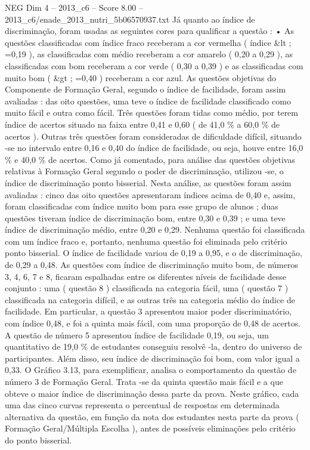 \begin{textsample}{NEG Dim 4 – 2013\_c6 – Score 8.00 – 2013\_c6/enade\_2013\_nutri\_5b06570937.txt}
Já quanto ao índice de discriminação, foram usadas as seguintes cores para qualificar a questão : • As questões classificadas com índice fraco receberam a cor vermelha ( índice \&lt ; =0,19 ), as classificadas com médio receberam a cor amarelo ( 0,20 a 0,29 ), as classificadas com bom receberam a cor verde ( 0,30 a 0,39 ) e as classificadas com muito bom ( \&gt ; =0,40 ) receberam a cor azul.
As questões objetivas do Componente de Formação Geral, segundo o índice de facilidade, foram assim avaliadas : das oito questões, uma teve o índice de facilidade classificado como muito fácil e outra como fácil.
Três questões foram tidas como médio, por terem índice de acertos situado na faixa entre 0,41 e 0,60 ( de 41,0 \% a 60,0 \% de acertos ).
Outras três questões foram consideradas de dificuldade difícil, situando -se no intervalo entre 0,16 e 0,40 do índice de facilidade, ou seja, houve entre 16,0 \% e 40,0 \% de acertos.
Como já comentado, para análise das questões objetivas relativas à Formação Geral segundo o poder de discriminação, utilizou -se, o índice de discriminação ponto bisserial.
Nesta análise, as questões foram assim avaliadas : cinco das oito questões apresentaram índices acima de 0,40 e, assim, foram classificadas com índice muito bom para esse grupo de alunos ; duas questões tiveram índice de discriminação bom, entre 0,30 e 0,39 ; e uma teve índice de discriminação médio, entre 0,20 e 0,29.
Nenhuma questão foi classificada com um índice fraco e, portanto, nenhuma questão foi eliminada pelo critério ponto bisserial.
O índice de facilidade variou de 0,19 a 0,95, e o de discriminação, de 0,29 a 0,48.
As questões com índice de discriminação muito bom, de números 3, 4, 6, 7 e 8, ficaram espalhadas entre os diferentes níveis de facilidade desse conjunto : uma ( questão 8 ) classificada na categoria fácil, uma ( questão 7 ) classificada na categoria difícil, e as outras três na categoria médio do índice de facilidade.
Em particular, a questão 3 apresentou maior poder discriminatório, com índice 0,48, e foi a quinta mais fácil, com uma proporção de 0,48 de acertos.
A questão de número 5 apresentou índice de facilidade 0,19, ou seja, um quantitativo de 19,0 \% de estudantes conseguiu resolvê -la, dentro do universo de participantes.
Além disso, seu índice de discriminação foi bom, com valor igual a 0,33.
O Gráfico 3.13, para exemplificar, analisa o comportamento da questão de número 3 de Formação Geral.
Trata -se da quinta questão mais fácil e a que obteve o maior índice de discriminação dessa parte da prova.
Neste gráfico, cada uma das cinco curvas representa o percentual de respostas em determinada alternativa da questão, em função da nota dos estudantes nesta parte da prova ( Formação Geral/Múltipla Escolha ), antes de possíveis eliminações pelo critério do ponto bisserial.

\end{textsample}

